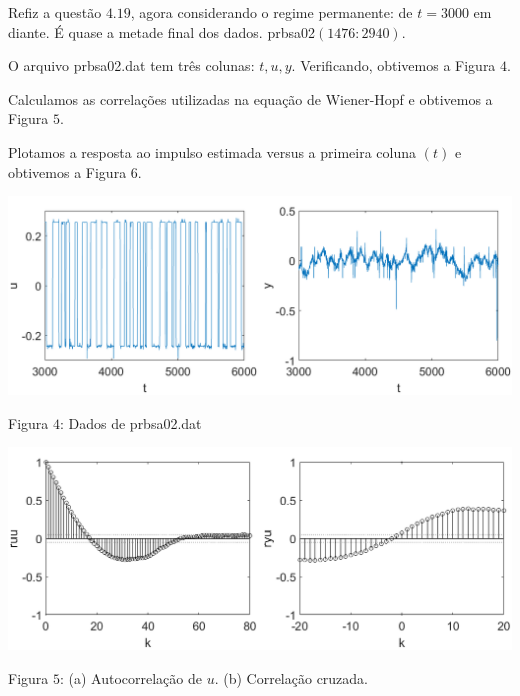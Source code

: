 \documentclass{rbfin}
\begin{document}
\dotfill

Refiz a questão $4.19$, agora considerando o regime permanente: de $t = 3000$ em diante. É quase a metade final dos dados. prbsa02$(1476:2940)$.

O arquivo prbsa02.dat tem três colunas: $t,u,y$. Verificando, obtivemos a Figura $4$.

Calculamos as correlações utilizadas na equação de Wiener-Hopf e obtivemos a Figura $5$.

Plotamos a resposta ao impulso estimada versus a primeira coluna $(t)$ e obtivemos a Figura $6$.

\begin{center}
\includegraphics[scale=0.65]{4uy}

Figura $4$: Dados de prbsa02.dat
\end{center}

\newpage

\begin{center}
\includegraphics[scale=0.65]{4ruu}

Figura $5$: (a) Autocorrelação de $u$. (b) Correlação cruzada.
\end{center}
\end{document}
